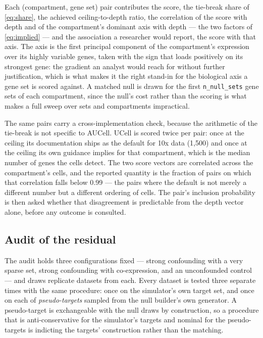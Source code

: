 \documentclass[11pt]{article}
\newcommand{\code}[1]{\texttt{#1}}
\begin{document}
Each (compartment, gene set) pair contributes the score, the tie-break share of
\eqref{eq:share}, the achieved ceiling-to-depth ratio, the correlation of the
score with depth and of the compartment's dominant axis with depth --- the two
factors of \eqref{eq:implied} --- and the association a researcher would report,
the score with that axis. The axis is the first principal component of the
compartment's expression over its highly variable genes, taken with the sign
that loads positively on its strongest gene: the gradient an analyst would reach
for without further justification, which is what makes it the right stand-in for
the biological axis a gene set is scored against. A matched null is drawn for
the first \code{n\_null\_sets} gene sets of each compartment, since the null's
cost rather than the scoring is what makes a full sweep over \benchSets{} sets
and \benchGroups{} compartments impractical.

The same pairs carry a cross-implementation check, because the arithmetic of the
tie-break is not specific to AUCell. UCell \citep{andreatta2021} is scored twice
per pair: once at the ceiling its documentation ships as the default for 10x
data (1{,}500) and once at the ceiling its own guidance implies for that
compartment, which is the median number of genes the cells detect. The two score
vectors are correlated across the compartment's cells, and the reported quantity
is the fraction of pairs on which that correlation falls below 0.99 --- the
pairs where the default is not merely a different number but a different
ordering of cells. The pair's inclusion probability is then asked whether that
disagreement is predictable from the depth vector alone, before any outcome is
consulted.

\subsection{Audit of the residual}
The audit holds three configurations fixed --- strong confounding with a very
sparse set, strong confounding with co-expression, and an unconfounded control
--- and draws \auditReps{} replicate datasets from each. Every dataset is tested
three separate times with the same procedure: once on the simulator's own target
set, and once on each of \auditPseudo{} \emph{pseudo-targets} sampled from the
null builder's own generator. A pseudo-target is exchangeable with the null
draws by construction, so a procedure that is anti-conservative for the
simulator's targets and nominal for the pseudo-targets is indicting the targets'
construction rather than the matching.
\end{document}
